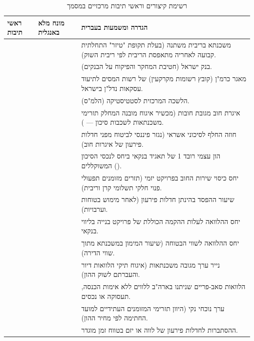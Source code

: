 \documentclass[12pt,a4paper,oneside]{book}
\begin{document}
\begin{table}[htbp]
\centering
\caption*{רשימת קיצורים וראשי תיבות מרכזיים במסמך}
\small
\begin{tabularx}{\textwidth}{R{2.4cm} R{4.6cm} Y}
\toprule
{}
\textbf{ראשי תיבות} & \textbf{מונח מלא באנגלית} & \textbf{הגדרה ומשמעות בעברית} \\
\midrule
{} &  & משכנתא בריבית משתנה (בעלת תקופת "טיזר" התחלתית קבועה לאחריה מתאפסת הריבית לפי ריבית השוק). \\
 &  & בנק ישראל (חטיבת המחקר והפיקוח על הבנקים). \\
 &  & מאגר כרמ"ן (קובץ רשומות מקרקעין) של רשות המסים לתיעוד עסקאות נדל"ן בישראל. \\
 &  & הלשכה המרכזית לסטטיסטיקה (הלמ"ס). \\
 &  & איגרת חוב מגובת חובות (מכשיר איגוח מובנה המחלק תזרימי משכנתאות לשכבות סיכון --- ). \\
 &  & חוזה החלף לסיכוני אשראי (נגזר פיננסי לביטוח מפני חדלות פירעון של איגרות חוב). \\
 &  & הון עצמי רובד \num{1} של תאגיד בנקאי ביחס לנכסי הסיכון המשוקללים (). \\
 &  & יחס כיסוי שירות החוב בפרויקט יזמי (תזרים מזומנים תפעולי פנוי חלקי תשלומי קרן וריבית). \\
 &  & שיעור ההפסד בהינתן חדלות פירעון (לאחר מימוש בטוחות וערבויות). \\
 &  & יחס ההלוואה לעלות ההקמה הכוללת של פרויקט בנייה בליווי בנקאי. \\
 &  & יחס ההלוואה לשווי הבטוחה (שיעור המימון במשכנתא מתוך שווי הדירה). \\
 &  & נייר ערך מגובה משכנתאות (איגוח תיקי הלוואות דיור והעברתם לשוק ההון). \\
 &  & הלוואות סאב-פריים שניתנו בארה"ב ללווים ללא אימות הכנסה, תעסוקה או נכסים. \\
 &  & ערך נוכחי נקי (היוון תזרימי המזומנים העתידיים למועד החתימה לפי מחיר ההון). \\
 &  & ההסתברות לחדלות פירעון של לווה או יזם בטווח זמן מוגדר. \\

\end{tabularx}
\end{table}
\end{document}
